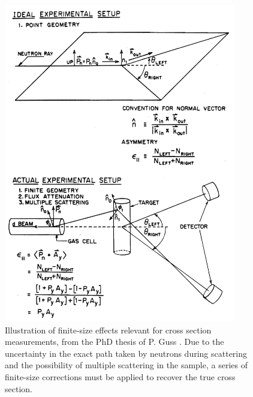 \begin{figure}[ht!]
    \begin{center}
        \includegraphics[width = 0.9\textwidth]{figures/GussFiniteSizeDiagram.png}
        \caption[Illustration of finite-size effects relevant for \el cross
        section measurements]
        {
            Illustration of finite-size effects relevant for \el cross
            section measurements, from the PhD thesis of P. Guss
            \cite{GussPhDThesis}. Due to the uncertainty in the exact path taken
            by neutrons during scattering and the possibility of multiple
            scattering in the sample, a series of finite-size corrections
            must be applied to recover the true cross section.
        }
        \label{GussFiniteSizeDiagram}
    \end{center}
\end{figure}

